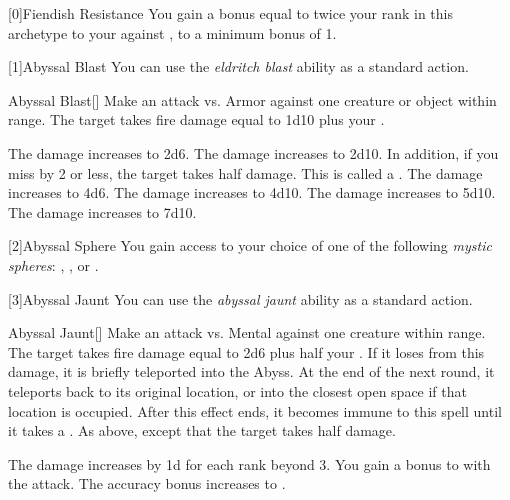         [0]{Fiendish Resistance} You gain a bonus equal to twice your rank in this archetype to your  against , to a minimum bonus of 1.

        [1]{Abyssal Blast} You can use the \textit{eldritch blast} ability as a standard action.
        \begin{freeability}{Abyssal Blast}[]
            Make an attack vs. Armor against one creature or object within \rngmed range.
            \hit The target takes fire damage equal to 1d10 plus your .

            \rankline
             The damage increases to 2d6.
             The damage increases to 2d10.
                In addition, if you miss by 2 or less, the target takes half damage.
                This is called a .
             The damage increases to 4d6.
             The damage increases to 4d10.
             The damage increases to 5d10.
             The damage increases to 7d10.
        \end{freeability}

        [2]{Abyssal Sphere} You gain access to your choice of one of the following \textit{mystic spheres}: , , or .

        [3]{Abyssal Jaunt} You can use the \textit{abyssal jaunt} ability as a standard action.
        \begin{freeability}{Abyssal Jaunt}[]
            Make an attack vs. Mental against one creature within \rngmed range.
            \hit The target takes fire damage equal to 2d6 plus half your .
            If it loses  from this damage, it is briefly teleported into the Abyss.
            At the end of the next round, it teleports back to its original location, or into the closest open space if that location is occupied.
            After this effect ends, it becomes immune to this spell until it takes a .
            \glance As above, except that the target takes half damage.

            \rankline
            The damage increases by \plus1d for each rank beyond 3.
             You gain a  bonus to  with the attack.
             The accuracy bonus increases to .
        \end{freeability}

